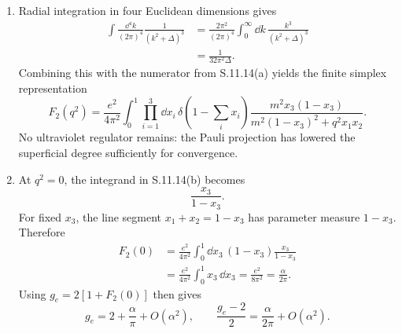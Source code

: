 \begin{enumerate}
\begin{enumerate}
For the remaining terms, move \(\sl p\) and \(\sl p'\) onto the external
spinors and use
\((\ii\sl p+m)u(p)=0\) and
\(\bar u(p')(\ii\sl p'+m)=0\).  The part independent of \(\ell\) that is not
proportional to \(\gamma^\mu\) reduces to
\[
 \boxed{\;
 N^\mu_{\rm Pauli}
 =2\ii m(x_1+x_2)x_3(p^\mu+p'{}^\mu).
 \;}
\]
The Gordon identity rewrites \(p^\mu+p'{}^\mu\) between on-shell spinors as
a combination of \(\gamma^\mu\) and
\(\ii\sigma^{\mu\nu}q_\nu\).  After the \(F_1(0)\) piece is fixed by charge
renormalization, the remainder is exactly the Pauli form factor.
\item
Radial integration in four Euclidean dimensions gives
\[
\begin{aligned}
 \int\frac{\dd^4k}{(2\pi)^4}\frac1{(k^2+\Delta)^3}
 &=\frac{2\pi^2}{(2\pi)^4}
 \int_0^\infty \dd k\,\frac{k^3}{(k^2+\Delta)^3}\\
 &=\boxed{\frac1{32\pi^2\Delta}}.
\end{aligned}
\]
Combining this with the numerator from S.11.14(a) yields the finite simplex
representation
\[
 \boxed{\;
 F_2(q^2)=\frac{e^2}{4\pi^2}
 \int_0^1\prod_{i=1}^3\dd x_i\,
 \delta(1-\textstyle\sum_i x_i)
 \frac{m^2x_3(1-x_3)}
 {m^2(1-x_3)^2+q^2x_1x_2}.
 \;}
\]
No ultraviolet regulator remains: the Pauli projection has lowered the
superficial degree sufficiently for convergence.
\item
At \(q^2=0\), the integrand in S.11.14(b) becomes
\[
 \frac{x_3}{1-x_3}.
\]
For fixed \(x_3\), the line segment
\(x_1+x_2=1-x_3\) has parameter measure \(1-x_3\).  Therefore
\[
\begin{aligned}
 F_2(0)
 &=\frac{e^2}{4\pi^2}\int_0^1\dd x_3\,
 (1-x_3)\frac{x_3}{1-x_3}\\
 &=\frac{e^2}{4\pi^2}\int_0^1x_3\,\dd x_3
 =\frac{e^2}{8\pi^2}
 =\boxed{\frac{\alpha}{2\pi}}.
\end{aligned}
\]
Using \(g_e=2[1+F_2(0)]\) then gives
\[
 \boxed{\qquad g_e=2+\frac{\alpha}{\pi}+O(\alpha^2),\qquad
 \frac{g_e-2}{2}=\frac{\alpha}{2\pi}+O(\alpha^2).\qquad}
\]
\end{enumerate}
\end{enumerate}
